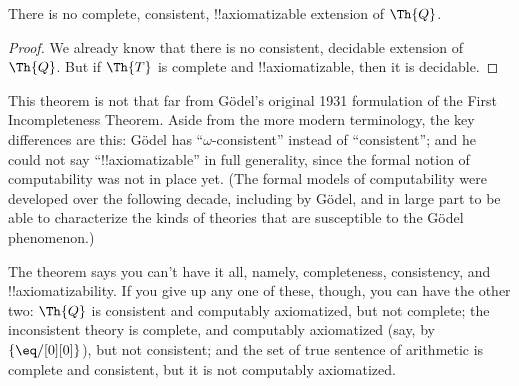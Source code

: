 \documentclass[../../../include/open-logic-section]{subfiles}
\begin{document}


\begin{thm}
There is no complete, consistent, !!{axiomatizable} extension of
$\Th{Q}$.
\end{thm}

\begin{proof}
We already know that there is no consistent, decidable extension of
$\Th{Q}$. But if $\Th{T}$ is complete and !!{axiomatizable}, then
it is decidable. 
\end{proof}

\begin{explain}
This theorem is not that far from G\"odel's original 1931 formulation
of the First Incompleteness Theorem. Aside from the more modern
terminology, the key differences are this: G\"odel has
``$\omega$-consistent'' instead of ``consistent''; and he could not
say ``!!{axiomatizable}'' in full generality, since the formal
notion of computability was not in place yet. (The formal models of
computability were developed over the following decade, including by
G\"odel, and in large part to be able to characterize the kinds of
theories that are susceptible to the G\"odel phenomenon.)

The theorem says you can't have it all, namely, completeness,
consistency, and !!{axiomatizability}. If you give up any one of
these, though, you can have the other two: $\Th{Q}$ is consistent and
computably axiomatized, but not complete; the inconsistent theory is
complete, and computably axiomatized (say, by $\{ \eq/[0][0] \}$), but
not consistent; and the set of true sentence of arithmetic is complete
and consistent, but it is not computably axiomatized.
\end{explain}
\end{document}
